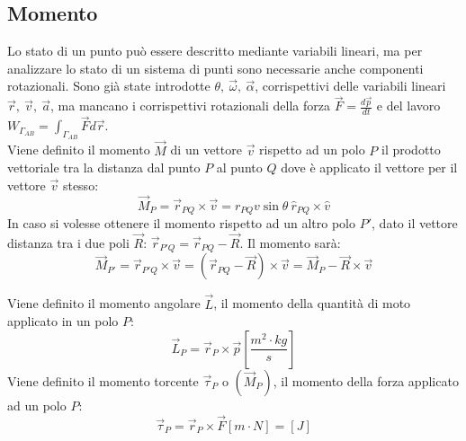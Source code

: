 \documentclass{article}
\numberwithin{equation}{subsection}
\begin{document}
\subsection{Momento}


Lo stato di un punto può essere descritto mediante variabili 
lineari, ma per analizzare lo stato di un sistema di punti 
sono necessarie anche componenti rotazionali. Sono già state 
introdotte $\theta,\:\vec{\omega},\:\vec{\alpha}$, corrispettivi 
delle variabili lineari $\vec{r},\:\vec{v},\:\vec{a}$, ma 
mancano i corrispettivi rotazionali della forza $\vec{F}=\displaystyle\frac{d\vec{p}}{dt}$ 
e del lavoro $W_{\Gamma_{AB}}=\displaystyle\int_{\Gamma_{AB}}\vec{F}d\vec{r}$. 
\\
Viene definito il momento $\vec{M}$ di un vettore $\vec{v}$ rispetto ad 
un polo $P$ il prodotto vettoriale tra la distanza dal punto 
$P$ al punto $Q$ dove è applicato il vettore per il vettore $\vec{v}$ stesso: 
\begin{equation*}
    \vec{M}_P=\vec{r}_{PQ}\times\vec{v}=r_{PQ}v\sin\theta\:\hat{r}_{PQ}\times\hat{v}
\end{equation*}
In caso si volesse ottenere il momento rispetto ad un altro polo 
$P'$, dato  il vettore distanza tra i due poli $\vec{R}$: 
$\vec{r}_{P'Q}=\vec{r}_{PQ}-\vec{R}$. Il momento sarà:
\begin{equation*}
    \vec{M}_{P'}=\vec{r}_{P'Q}\times\vec{v}=(\vec{r}_{PQ}-\vec{R})\times\vec{v}=\vec{M}_P-\vec{R}\times\vec{v}
\end{equation*}

\begin{center}\end{center}

Viene definito il momento angolare $\vec{L}$, il momento della 
quantità di moto applicato in un polo $P$:
\begin{equation} 
    \vec{L}_P=\vec{r}_P\times\vec{p}\left[\displaystyle\frac{m^2\cdot kg}{s}\right]
\end{equation}
Viene definito il momento torcente $\vec{\tau}_P$ o $(\vec{M}_P)$, il momento della forza applicato 
ad un polo $P$:
\begin{equation}
    \vec{\tau}_P=\vec{r}_P\times\vec{F}\left[m\cdot N\right]=[J]
\end{equation}
\end{document}
